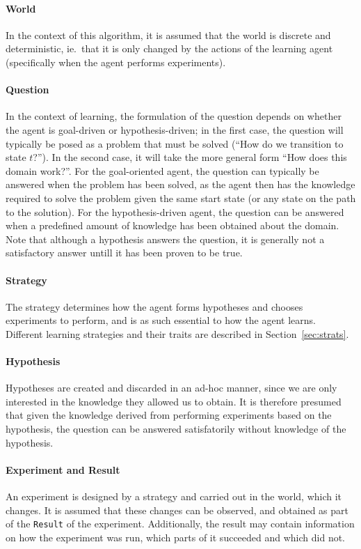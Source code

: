 \documentclass[../Master.tex]{subfiles}
\begin{document}
\paragraph*{World}
In the context of this algorithm, it is assumed that the world is discrete and deterministic, ie.\ that it is only changed by the actions of the learning agent (specifically when the agent performs experiments).

\paragraph*{Question}
In the context of learning, the formulation of the question depends on whether the agent is goal-driven or hypothesis-driven; in the first case, the question will typically be posed as a problem that must be solved (``How do we transition to state $t$?''). In the second case, it will take the more general form ``How does this domain work?''.
For the goal-oriented agent, the question can typically be answered when the problem has been solved, as the agent then has the knowledge required to solve the problem given the same start state (or any state on the path to the solution). For the hypothesis-driven agent, the question can be answered when a predefined amount of knowledge has been obtained about the domain. Note that although a hypothesis answers the question, it is generally not a satisfactory answer untill it has been proven to be true.

\paragraph*{Strategy}
The strategy determines how the agent forms hypotheses and chooses experiments to perform, and is as such essential to how the agent learns. Different learning strategies and their traits are described in Section~\ref{sec:strats}.

\paragraph*{Hypothesis}
Hypotheses are created and discarded in an ad-hoc manner, since we are only interested in the knowledge they allowed us to obtain. It is therefore presumed that given the knowledge derived from performing experiments based on the hypothesis, the question can be answered satisfatorily without knowledge of the hypothesis.

\paragraph*{Experiment and Result}
An experiment is designed by a strategy and carried out in the world, which it changes. It is assumed that these changes can be observed, and obtained as part of the \texttt{Result} of the experiment. Additionally, the result may contain information on how the experiment was run, which parts of it succeeded and which did not.
\end{document}
